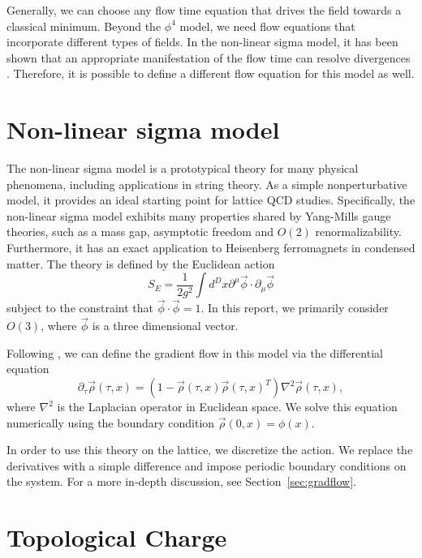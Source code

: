 \documentclass[12pt]{report}
\begin{document}
Generally, we can choose any flow time equation that drives the field towards a classical minimum. Beyond the $\phi^4$ model, we need flow equations that incorporate different types of fields. In the non-linear sigma model, it has been shown that an appropriate manifestation of the flow time can resolve divergences \cite{makino2015a}. Therefore, it is possible to define a different flow equation for this model as well.


\section{Non-linear sigma model}

The non-linear sigma model is a prototypical theory for many physical phenomena, including applications in string theory. As a simple nonperturbative model, it provides an ideal starting point for lattice QCD studies. Specifically, the non-linear sigma model exhibits many properties shared by Yang-Mills gauge theories, such as a mass gap, asymptotic freedom and $O(2)$ renormalizability. Furthermore, it has an exact application to Heisenberg ferromagnets in condensed matter. The theory is defined by the Euclidean action 
\begin{equation}
    S_E = \frac{1}{2g^2} \int d^Dx \partial^\mu \vec\phi \cdot \partial_\mu \vec\phi
\end{equation}
subject to the constraint that $\vec\phi\cdot\vec\phi = 1$. In this report, we primarily consider $O(3)$, where $\vec\phi$ is a three dimensional vector.

Following \cite{bietenholz2018}, we can define the gradient flow in this model via the differential equation
\begin{equation}
    \label{eq:nsm_gradflow}
    \partial_\tau \vec\rho (\tau,x) = \left( 1 - \vec\rho(\tau,x) \vec\rho(\tau,x)^T \right) \nabla^2 \vec\rho(\tau,x),
\end{equation}
where $\nabla^2$ is the Laplacian operator in Euclidean space. We solve this equation numerically using the boundary condition $\vec\rho(0,x) = \phi(x)$.

In order to use this theory on the lattice, we discretize the action. We replace the derivatives with a simple difference and impose periodic boundary conditions on the system. For a more in-depth discussion, see Section~\ref{sec:gradflow}.

\section{Topological Charge}
\end{document}
